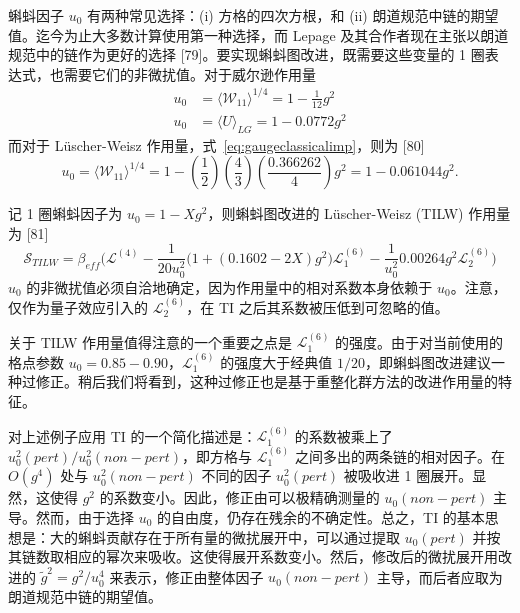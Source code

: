 蝌蚪因子 $u_0$ 有两种常见选择：(i) 方格的四次方根，和 (ii) 朗道规范中链的期望值。迄今为止大多数计算使用第一种选择，而 Lepage 及其合作者现在主张以朗道规范中的链作为更好的选择 [79]。要实现蝌蚪图改进，既需要这些变量的 1 圈表达式，也需要它们的非微扰值。对于威尔逊作用量
\begin{equation}
\begin{aligned}
u_0 &= \langle\mathcal{W}_{11}\rangle^{1/4} = 1 - \frac{1}{12}g^2\\
u_0 &= \langle U\rangle_{LG} = 1 - 0.0772g^2
\end{aligned}
\end{equation}
而对于 L\"uscher-Weisz 作用量，式~\ref{eq:gaugeclassicalimp}，则为 [80]
\begin{equation}
u_0 = \langle\mathcal{W}_{11}\rangle^{1/4}
    = 1 - \left(\frac{1}{2}\right)\left(\frac{4}{3}\right)
        \left(\frac{0.366262}{4}\right)g^2
    = 1 - 0.061044g^2.
\end{equation}

记 1 圈蝌蚪因子为 $u_0 = 1 - Xg^2$，则蝌蚪图改进的 L\"uscher-Weisz (TILW) 作用量为 [81]
\begin{equation}
\mathcal{S}_{TILW} = \beta_{eff}\bigg(\mathcal{L}^{(4)}
    - \frac{1}{20u_0^2}\big(1 + (0.1602-2X)g^2\big)\mathcal{L}_1^{(6)}
    - \frac{1}{u_0^2}0.00264g^2\mathcal{L}_2^{(6)}\bigg)
\label{eq:LWTIaction}
\end{equation}
$u_0$ 的非微扰值必须自洽地确定，因为作用量中的相对系数本身依赖于 $u_0$。注意，仅作为量子效应引入的 $\mathcal{L}_2^{(6)}$，在 TI 之后其系数被压低到可忽略的值。

关于 TILW 作用量值得注意的一个重要之点是 $\mathcal{L}_1^{(6)}$ 的强度。由于对当前使用的格点参数 $u_0 = 0.85-0.90$，$\mathcal{L}_1^{(6)}$ 的强度大于经典值 $1/20$，即蝌蚪图改进建议一种过修正。稍后我们将看到，这种过修正也是基于重整化群方法的改进作用量的特征。

对上述例子应用 TI 的一个简化描述是：$\mathcal{L}_1^{(6)}$ 的系数被乘上了 $u_0^2(pert)/u_0^2(non-pert)$，即方格与 $\mathcal{L}_1^{(6)}$ 之间多出的两条链的相对因子。在 $O(g^4)$ 处与 $u_0^2(non-pert)$ 不同的因子 $u_0^2(pert)$ 被吸收进 1 圈展开。显然，这使得 $g^2$ 的系数变小。因此，修正由可以极精确测量的 $u_0(non-pert)$ 主导。然而，由于选择 $u_0$ 的自由度，仍存在残余的不确定性。总之，TI 的基本思想是：大的蝌蚪贡献存在于所有量的微扰展开中，可以通过提取 $u_0(pert)$ 并按其链数取相应的幂次来吸收。这使得展开系数变小。然后，修改后的微扰展开用改进的 $\tilde g^2 = g^2/u_0^4$ 来表示，修正由整体因子 $u_0(non-pert)$ 主导，而后者应取为朗道规范中链的期望值。

